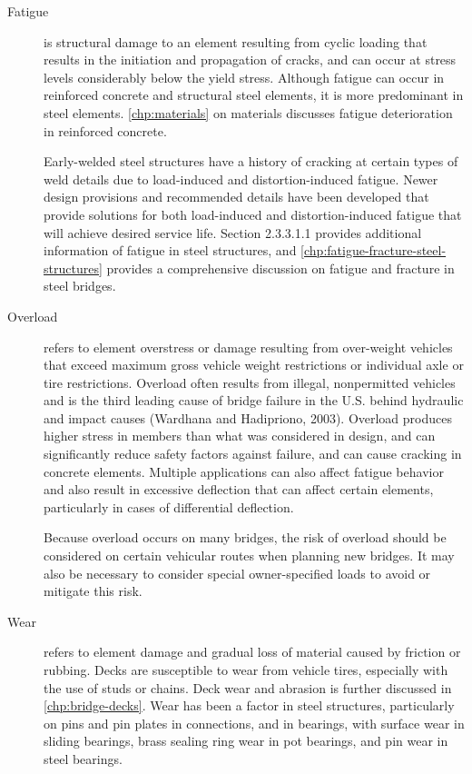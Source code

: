 \begin{description}
  \item [Fatigue] is structural damage to an element resulting from cyclic loading that results in the initiation and  propagation of cracks, and can occur at stress levels considerably below the yield stress. Although fatigue can occur in reinforced concrete and structural steel elements, it is more predominant in steel elements. \cref{chp:materials} on materials discusses fatigue deterioration in reinforced concrete.

  Early-welded steel structures have a history of cracking at certain types of weld details due to load-induced and distortion-induced fatigue. Newer design provisions and recommended details have been developed that provide solutions for both load-induced and distortion-induced fatigue that will achieve desired service life. Section 2.3.3.1.1 provides additional information of fatigue in steel structures, and \cref{chp:fatigue-fracture-steel-structures} provides a comprehensive discussion on fatigue and fracture in steel bridges.
  \item [Overload] refers to element overstress or damage resulting from over-weight vehicles that exceed maximum gross vehicle weight restrictions or individual axle or tire restrictions. Overload often results from illegal, nonpermitted vehicles and is the third leading cause of bridge failure in the U.S. behind hydraulic and impact causes (Wardhana and Hadipriono, 2003). Overload produces higher stress in members than what was considered in design,
  and can significantly reduce safety factors against failure, and can cause cracking in concrete elements. Multiple applications can also affect fatigue behavior and also result in excessive deflection that can affect certain elements, particularly in cases of differential deflection.

  Because overload occurs on many bridges, the risk of overload should be considered on certain vehicular routes when planning new bridges. It may also be necessary to consider special owner-specified loads to avoid or mitigate this risk.
  \item [Wear] refers to element damage and gradual loss of material caused by friction or rubbing. Decks are susceptible to wear from vehicle tires, especially with the use of studs or chains. Deck wear and abrasion is further discussed in \cref{chp:bridge-decks}. Wear has been a factor in steel structures, particularly on pins and pin plates in connections, and in bearings, with surface wear in sliding bearings, brass sealing ring wear in pot bearings, and pin wear in steel bearings.
\end{description}

